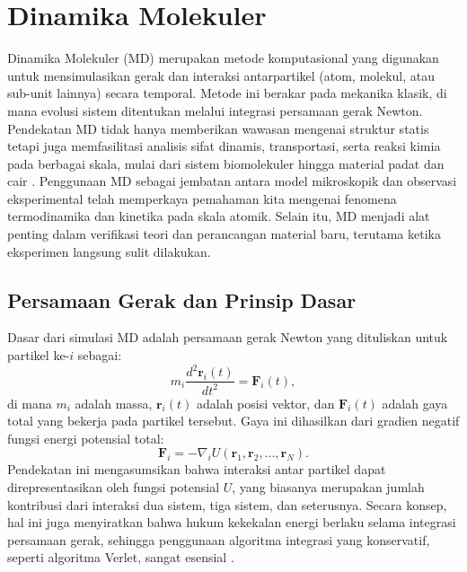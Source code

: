 \section{Dinamika Molekuler}
Dinamika Molekuler (MD) merupakan metode komputasional yang digunakan untuk mensimulasikan gerak dan interaksi antarpartikel (atom, molekul, atau sub-unit lainnya) secara temporal.
Metode ini berakar pada mekanika klasik, di mana evolusi sistem ditentukan melalui integrasi persamaan gerak Newton.
Pendekatan MD tidak hanya memberikan wawasan mengenai struktur statis tetapi juga memfasilitasi analisis sifat dinamis, transportasi, serta reaksi kimia pada berbagai skala, mulai dari sistem biomolekuler hingga material padat dan cair \citep{Allen1989,Frenkel2001}.
Penggunaan MD sebagai jembatan antara model mikroskopik dan observasi eksperimental telah memperkaya pemahaman kita mengenai fenomena termodinamika dan kinetika pada skala atomik.
Selain itu, MD menjadi alat penting dalam verifikasi teori dan perancangan material baru, terutama ketika eksperimen langsung sulit dilakukan.

\subsection{Persamaan Gerak dan Prinsip Dasar}
Dasar dari simulasi MD adalah persamaan gerak Newton yang dituliskan untuk partikel ke-\(i\) sebagai:
\begin{equation}
    m_i \frac{d^2 \mathbf{r}_i(t)}{dt^2} = \mathbf{F}_i(t),
\end{equation}
di mana \(m_i\) adalah massa, \(\mathbf{r}_i(t)\) adalah posisi vektor, dan \(\mathbf{F}_i(t)\) adalah gaya total yang bekerja pada partikel tersebut.
Gaya ini dihasilkan dari gradien negatif fungsi energi potensial total:
\begin{equation}
    \mathbf{F}_i = -\nabla_i U(\mathbf{r}_1, \mathbf{r}_2, \ldots, \mathbf{r}_N).
\end{equation}
Pendekatan ini mengasumsikan bahwa interaksi antar partikel dapat direpresentasikan oleh fungsi potensial \( U \), yang biasanya merupakan jumlah kontribusi dari interaksi dua sistem, tiga sistem, dan seterusnya.
Secara konsep, hal ini juga menyiratkan bahwa hukum kekekalan energi berlaku selama integrasi persamaan gerak, sehingga penggunaan algoritma integrasi yang konservatif, seperti algoritma Verlet, sangat esensial \citep{Allen1989}.

